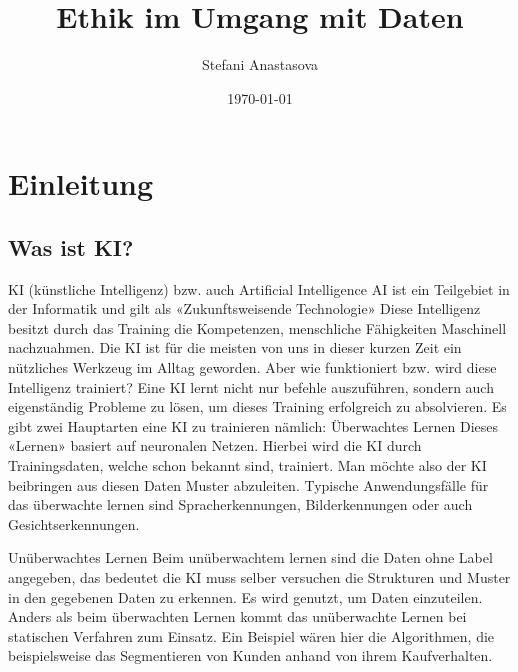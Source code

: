 \documentclass{report}
\title{Ethik im Umgang mit Daten}
\author{Stefani Anastasova}
\date{\today}
\begin{document}
\maketitle


\tableofcontents

\chapter{Einleitung}
\section{Was ist KI?}

KI (künstliche Intelligenz) bzw. auch Artificial Intelligence AI ist ein Teilgebiet in der Informatik und gilt als «Zukunftsweisende Technologie» Diese Intelligenz besitzt durch das Training die Kompetenzen, menschliche Fähigkeiten Maschinell nachzuahmen. Die KI ist für die meisten von uns in dieser kurzen Zeit ein nützliches Werkzeug im Alltag geworden. Aber wie funktioniert bzw. wird diese Intelligenz trainiert? 
Eine KI lernt nicht nur befehle auszuführen, sondern auch eigenständig Probleme zu lösen, um dieses Training erfolgreich zu absolvieren.
Es gibt zwei Hauptarten eine KI zu trainieren nämlich:  
Überwachtes Lernen
Dieses «Lernen» basiert auf neuronalen Netzen. Hierbei wird die KI durch Trainingsdaten, welche schon bekannt sind, trainiert. Man möchte also der KI beibringen aus diesen Daten Muster abzuleiten.
Typische Anwendungsfälle für das überwachte lernen sind Spracherkennungen, Bilderkennungen oder auch Gesichtserkennungen.

Unüberwachtes Lernen
Beim unüberwachtem lernen sind die Daten ohne Label angegeben, das bedeutet die KI muss selber versuchen die Strukturen und Muster in den gegebenen Daten zu erkennen. 
Es wird genutzt, um Daten einzuteilen. Anders als beim überwachten Lernen kommt das unüberwachte Lernen bei statischen Verfahren zum Einsatz. 
Ein Beispiel wären hier die Algorithmen, die beispielsweise das Segmentieren von Kunden anhand von ihrem Kaufverhalten. 
\end{document}
